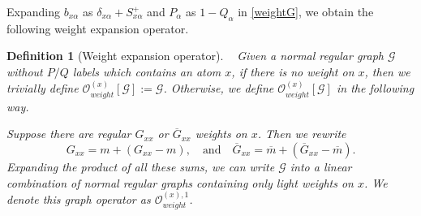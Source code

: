 \documentclass{article}
\newcommand{\1}{\mathds{1}}
\numberwithin{equation}{section}
\newcommand{\al}{\alpha}
\renewcommand{\cal}{\mathcal}
\theoremstyle{plain} %
\newtheorem{definition}[theorem]{Definition}
\theoremstyle{remark}
\newcommand{\cor}{\color{red}}
\newcommand{\cob}{\color{purple}}
\newcommand{\nc}{\normalcolor}
\newcommand{\hty}[1]{{\cor (ht: #1) }}
\begin{document}
 
Expanding $b_{x\al}$ as $\delta_{x\al} + S^+_{x\al}$ and $P_\al$ as $1-Q_\al$ in \eqref{weightG}, we obtain the following weight expansion operator. 
\begin{definition} [Weight expansion operator]\label{Ow-def} \ %
Given a normal regular graph $\cal G$ without $P/Q$ labels %
which contains an atom $x$, if there is no weight on $x$, then %
we trivially define $\cal O_{weight}^{(x)}[\cal G]:=\cal G$. Otherwise,  we define ${\cal O}_{weight}^{(x)}[\cal G]$ in the following way. 
 
 \medskip

 Suppose there are regular $G_{xx}$ or $\overline G_{xx}$ weights on $x$. Then we rewrite %
$$G_{xx}=m+ (G_{xx}-m),\quad \text{and}\quad \overline G_{xx}=\overline m+ (\overline G_{xx}-\overline m).$$
Expanding the product of all these sums, we can write $\cal G$ into a linear combination of normal regular graphs containing only light weights on $x$. We denote this graph operator as $ {\cal O}^{(x), 1}_{weight}$.  

 \medskip


\end{definition}
\end{document}
